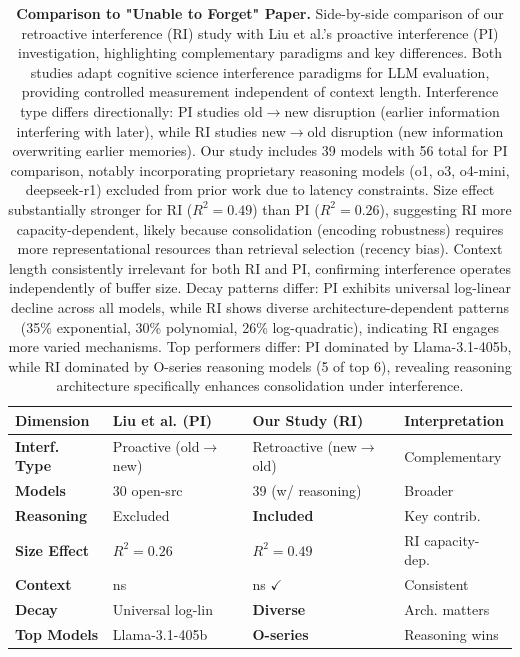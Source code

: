 \documentclass{article}
\begin{document}
\begin{table}[t]
\centering
\small
\caption{\textbf{Comparison to "Unable to Forget" Paper.}
Side-by-side comparison of our retroactive interference (RI) study with Liu et al.'s proactive interference (PI) investigation, highlighting complementary paradigms and key differences.
Both studies adapt cognitive science interference paradigms for LLM evaluation, providing controlled measurement independent of context length.
Interference type differs directionally: PI studies old$\rightarrow$new disruption (earlier information interfering with later), while RI studies new$\rightarrow$old disruption (new information overwriting earlier memories).
Our study includes 39 models with 56 total for PI comparison, notably incorporating proprietary reasoning models (o1, o3, o4-mini, deepseek-r1) excluded from prior work due to latency constraints.
Size effect substantially stronger for RI ($R^2 = 0.49$) than PI ($R^2 = 0.26$), suggesting RI more capacity-dependent, likely because consolidation (encoding robustness) requires more representational resources than retrieval selection (recency bias).
Context length consistently irrelevant for both RI and PI, confirming interference operates independently of buffer size.
Decay patterns differ: PI exhibits universal log-linear decline across all models, while RI shows diverse architecture-dependent patterns (35\% exponential, 30\% polynomial, 26\% log-quadratic), indicating RI engages more varied mechanisms.
Top performers differ: PI dominated by Llama-3.1-405b, while RI dominated by O-series reasoning models (5 of top 6), revealing reasoning architecture specifically enhances consolidation under interference.}
\setlength{\tabcolsep}{3pt}
\begin{tabular}{@{}p{2.5cm}p{2.8cm}p{2.8cm}p{2.5cm}@{}}
\toprule
Dimension & Liu et al. (PI) & Our Study (RI) & Interpretation \\
\midrule
\textbf{Interf. Type} & Proactive (old$\rightarrow$new) & Retroactive (new$\rightarrow$old) & Complementary \\
\textbf{Models} & 30 open-src & 39 (w/ reasoning) & Broader \\
\textbf{Reasoning} & Excluded & \textbf{Included} & Key contrib. \\
\textbf{Size Effect} & $R^2 = 0.26$ & \textbf{$R^2 = 0.49$} & RI capacity-dep. \\
\textbf{Context} & ns & ns $\checkmark$ & Consistent \\
\textbf{Decay} & Universal log-lin & \textbf{Diverse} & Arch. matters \\
\textbf{Top Models} & Llama-3.1-405b & \textbf{O-series} & Reasoning wins \\
\bottomrule
\end{tabular}
\end{table}
\end{document}
